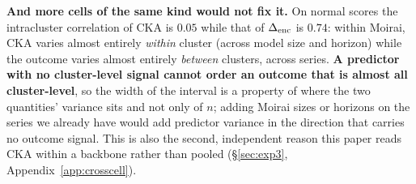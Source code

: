 \textbf{And more cells of the same kind would not fix it.} On normal scores the
intracluster correlation of CKA is $0.05$ while that of $\Delta_\text{enc}$ is $0.74$: within
Moirai, CKA varies almost entirely \emph{within} cluster (across model size and
horizon) while the outcome varies almost entirely \emph{between} clusters, across
series. \textbf{A predictor with no cluster-level signal cannot order an outcome
that is almost all cluster-level}, so the width of the interval is a property of
where the two quantities' variance sits and not only of $n$; adding Moirai
sizes or horizons on the series we already have would add predictor variance in
the direction that carries no outcome signal. This is also the second, independent
reason this paper reads CKA within a backbone rather than pooled
(\S\ref{sec:exp3}, Appendix~\ref{app:crosscell}).

